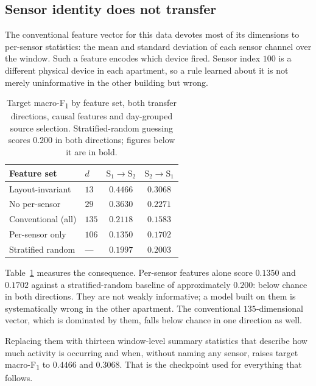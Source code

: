 \documentclass[a4paper,fleqn]{cas-dc}
\newcommand{\macf}{macro-F\textsubscript{1}}
\begin{document}
\subsection{Sensor identity does not transfer}
\label{sec:har-feat}

The conventional feature vector for this data devotes most of its dimensions to per-sensor
statistics: the mean and standard deviation of each sensor channel over the window. Such a
feature encodes which device fired. Sensor index $100$ is a different physical device in
each apartment, so a rule learned about it is not merely uninformative in the other
building but wrong.

\begin{table}[t]
\centering
\caption{Target \macf{} by feature set, both transfer directions, causal features and
day-grouped source selection. Stratified-random guessing scores $0.200$ in both
directions; figures below it are in bold.}
\label{tab:harfeat}
\small
\begin{tabular}{@{}llcc@{}}
\toprule
Feature set & $d$ & $\text{S}_1\!\to\!\text{S}_2$ & $\text{S}_2\!\to\!\text{S}_1$ \\
\midrule
Layout-invariant & $13$ & $\mathbf{0.4466}$ & $\mathbf{0.3068}$ \\
No per-sensor & $29$ & $0.3630$ & $0.2271$ \\
Conventional (all) & $135$ & $0.2118$ & $\mathbf{0.1583}$ \\
Per-sensor only & $106$ & $\mathbf{0.1350}$ & $\mathbf{0.1702}$ \\
\midrule
Stratified random & --- & $0.1997$ & $0.2003$ \\
\bottomrule
\end{tabular}
\end{table}

Table~\ref{tab:harfeat} measures the consequence. Per-sensor features alone score $0.1350$
and $0.1702$ against a stratified-random baseline of approximately $0.200$: below chance in
both directions. They are not weakly informative; a model built on them is systematically
wrong in the other apartment. The conventional $135$-dimensional vector, which is dominated
by them, falls below chance in one direction as well.

Replacing them with thirteen window-level summary statistics that describe how much
activity is occurring and when, without naming any sensor, raises target \macf{} to $0.4466$
and $0.3068$. That is the checkpoint used for everything that follows.
\end{document}
